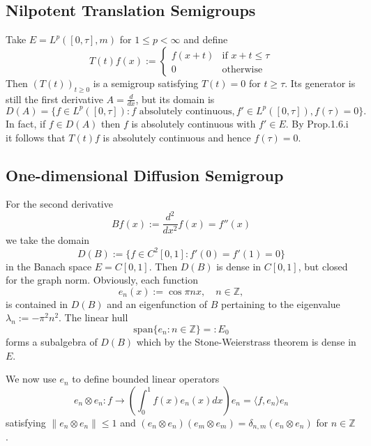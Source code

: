 \subsection{Nilpotent Translation Semigroups}
Take $E=L^p([0,\tau],m)$ for $1 \leq p < \infty$ and define
\[
T(t)f(x) := \begin{cases}
f(x+t) & \text{if } x+t \leq \tau \\
0 & \text{otherwise}
\end{cases}
\]
Then $(T(t))_{t \geq 0}$ is a semigroup satisfying $T(t)=0$ for $t \geq \tau$.
Its generator is still the first derivative $A=\frac{d}{dx}$, but its domain is
\[
D(A) = \{f \in L^p([0,\tau]): f \text{ absolutely continuous}, f' \in L^p([0,\tau]), f(\tau)=0\}.
\]
In fact, if $f \in D(A)$ then $f$ is absolutely continuous with $f' \in E$.
By Prop.1.6.i it follows that $T(t)f$ is absolutely continuous and hence $f(\tau)=0$.
\subsection{One-dimensional Diffusion Semigroup}
For the second derivative
\[
Bf(x) := \frac{d^2}{dx^2}f(x) = f''(x)
\]
we take the domain
\[
D(B) := \{f \in C^2[0,1]: f'(0)=f'(1)=0\}
\]
in the Banach space $E=C[0,1]$.
Then $D(B)$ is dense in $C[0,1]$, but closed for the graph norm.
Obviously, each function
\[
e_{n}(x) := \cos \pi nx, \quad n \in \mathbb{Z},
\]
is contained in $D(B)$ and an eigenfunction of $B$ pertaining to the eigenvalue $\lambda_{n} := -\pi^2n^2$.
The linear hull
\[
\text{span}\{e_{n}: n \in \mathbb{Z}\} =: E_0
\]
forms a subalgebra of $D(B)$ which by the Stone-Weierstrass theorem is dense in $E$.

We now use $e_{n}$ to define bounded linear operators
\[
e_{n} \otimes e_{n}: f \rightarrow \left(\int_0^1 f(x)e_{n}(x)dx\right)e_{n} = \langle f,e_{n}\rangle e_{n}
\]
satisfying $\|e_{n} \otimes e_{n}\| \leq 1$ and
$(e_{n} \otimes e_{n})(e_{m} \otimes e_{m}) = \delta_{n,m}(e_{n} \otimes e_{n})$ for $n \in \mathbb{Z}$.

